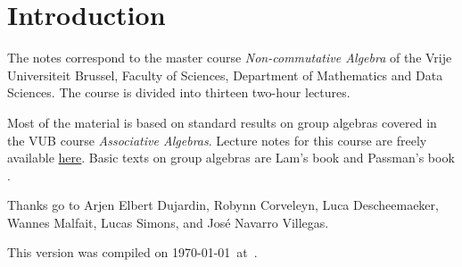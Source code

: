 \section*{Introduction}

The notes correspond to the master  
course \emph{Non-commutative Algebra} of the 
Vrije Universiteit Brussel, 
Faculty of Sciences, 
Department of Mathematics and Data Sciences. The course
is divided into thirteen two-hour lectures. 

Most of the material is based on standard 
results on group algebras covered in the VUB course \emph{Associative Algebras}. Lecture  
notes for this course are freely available  
\href{https://github.com/vendramin/associative}{here}. 
Basic texts on group algebras are Lam's book \cite{MR1125071}
and Passman's book \cite{MR798076}.

 
Thanks go to Arjen Elbert Dujardin, Robynn Corveleyn, 
Luca Descheemaeker, Wannes Malfait, Lucas Simons, 
and
José Navarro Villegas. 

This version 
was compiled on \today~at~\currenttime.

